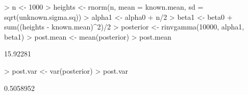 \documentclass{beamer}
\begin{document}
\begin{frame}[fragile]
\tiny
\begin{Schunk}
\begin{Sinput}
> n <- 1000
> heights <- rnorm(n, mean = known.mean, sd = sqrt(unknown.sigma.sq))
> alpha1 <- alpha0 + n/2
> beta1 <- beta0 + sum((heights - known.mean)^2)/2
> posterior <- rinvgamma(10000, alpha1, beta1)
> post.mean <- mean(posterior)
> post.mean
\end{Sinput}
\begin{Soutput}
[1] 15.92281
\end{Soutput}
\begin{Sinput}
> post.var <- var(posterior)
> post.var
\end{Sinput}
\begin{Soutput}
[1] 0.5058952
\end{Soutput}
\end{Schunk}
\end{frame}
\end{document}
